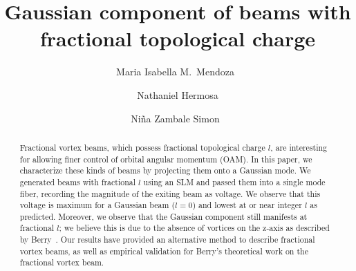 \documentclass[10pt,a4paper,twoside]{article}
\begin{document}
\title{\TitleFont Gaussian component of beams with fractional topological charge}

\author[*]{Maria Isabella M.~Mendoza~\authorsep}
\author[ ]{Nathaniel Hermosa \authorsep}
\author[ ]{Ni\~na Zambale Simon~\lastauthorsep}

\begin{abstract}
\noindent
Fractional vortex beams, which possess fractional topological charge $l$, are interesting for allowing finer control of orbital angular momentum (OAM). In this paper, we characterize these kinds of beams by projecting them onto a Gaussian mode. We generated beams with fractional $l$ using an SLM and passed them into a single mode fiber, recording the magnitude of the exiting beam as voltage. We observe that this voltage is maximum for a Gaussian beam ($l=0$) and lowest at or near integer $l$ as predicted. Moreover, we observe that the Gaussian component still manifests at fractional $l$; we believe this is due to the absence of vortices on the z-axis as described by Berry~\cite{Berry}. Our results have provided an alternative method to describe fractional vortex beams, as well as empirical validation for Berry's theoretical work on the fractional vortex beam.


\end{abstract}
\end{document}
